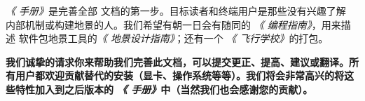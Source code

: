 \medskip

\medskip

\ifchinese
\textit{《\FlightGear{} 手册》}是完善全部 \FlightGear{} 文档的第一步。目标读者和终端用户是那些没有兴趣了解  内部机制或构建地景的人。我们希望有朝一日会有随同的 \textit{《\FlightGear{} 编程指南》}，用来描述 \TerraGear{} 软件包地景工具的\textit{《\FlightGear{} 地景设计指南》}；还有一个 \textit{《\FlightGear{} 飞行学校》}的打包。
\medskip

\textbf{我们诚挚的请求你来帮助我们完善此文档，可以提交更正、提高、建议或翻译。所有用户都欢迎贡献替代的安装（显卡、操作系统等等）。我们将会非常高兴的将这些特性加入到之后版本的 \textit{《\FlightGear{} 手册》}中（当然我们也会感谢您的贡献）。}
\fi
%


